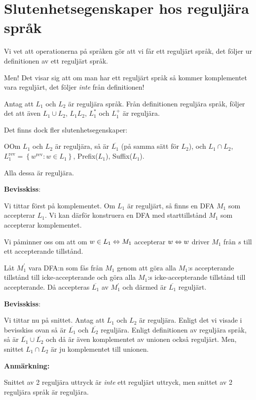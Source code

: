 \section{Slutenhetsegenskaper hos reguljära språk}\par
\noindent Vi vet att operationerna på språken gör att vi får ett reguljärt språk, det följer ur definitionen av ett reguljärt språk.\par
\noindent Men! Det visar sig att om man har ett reguljärt språk så kommer komplementet vara reguljärt, det följer \textit{inte} från definitionen!
\par\bigskip
\noindent Antag att $L_1$ och $L_2$ är reguljära språk. Från definitionen reguljära språk, följer det att även $L_1\cup L_2$, $L_1L_2$, $L_1^*$ och $L_1^+$ är reguljära.\par
\noindent Det finns dock fler slutenhetsegenskaper:
\par\bigskip
\begin{theo}
  OOm $L_1$ och $L_2$ är reguljära, så är $\overline{L_1}$ (på samma sätt för $L_2$), och $L_1\cap L_2$, $L_1^{\text{rev}} = \left\{w^{\text{rev}}: w\in L_1\right\}$, Prefix($L_1$), Suffix($L_1$).\par
  \noindent Alla dessa är reguljära.
\end{theo}
\par\bigskip
\noindent\textbf{Bevisskiss}:\par
\noindent Vi tittar först på komplementet. Om $L_1$ är reguljärt, så finns en DFA $M_1$ som accepterar $L_1$. Vi kan därför konstruera en DFA med starttillstånd $M_1$ som accepterar komplementet.\par
\noindent Vi påminner oss om att om $w\in L_1\Leftrightarrow M_1$ accepterar $w\Leftrightarrow w$ driver $M_1$ från $s$ till ett accepterande tillstånd.\par
\noindent Låt $M_1^{\prime}$ vara DFA:n som fås från $M_1$ genom att göra alla $M_1$:s accepterande tillstånd till icke-accepterande och göra alla $M_1$:s icke-accepterande tillstånd till accepterande. Då accepteras $\overline{L_1}$ av $M_1^{\prime}$ och därmed är $\overline{L_1}$ reguljärt.
\par\bigskip
\noindent\textbf{Bevisskiss}:\par
\noindent Vi tittar nu på snittet. Antag att $L_1$ och $L_2$ är reguljära. Enligt det vi visade i bevisskiss ovan så är $\overline{L_1}$ och $\overline{L_2}$ reguljära. Enligt definitionen av reguljära språk, så är $\overline{L_1}\cup\overline{L_2}$ och då är även komplementet av unionen också reguljärt. Men, snittet $L_1\cap L_2$ är ju komplementet till unionen.
\par\bigskip
\noindent\textbf{Anmärkning:}\par
\noindent Snittet av 2 reguljära uttryck är \textit{inte} ett reguljärt uttryck, men snittet av 2 reguljära språk är reguljära.
\newpage
